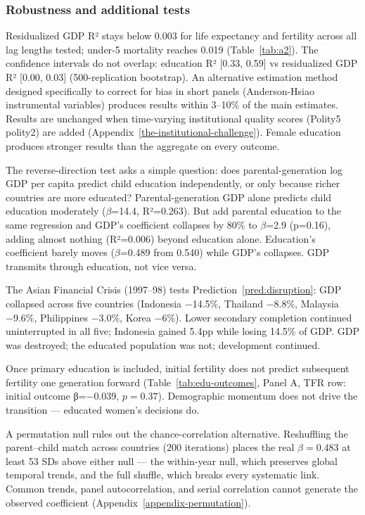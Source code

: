 \documentclass[12pt,letterpaper]{article}
\begin{document}
\subsubsection*{Robustness and additional tests}

Residualized GDP R² stays below 0.003 for life expectancy and fertility
across all lag lengths tested; under-5 mortality reaches 0.019
(Table~\ref{tab:a2}). The confidence intervals do not overlap: education R²
[0.33, 0.59] vs residualized GDP R² [0.00, 0.03] (500-replication
bootstrap). An alternative estimation method designed
specifically to correct for bias in short panels (Anderson-Hsiao
instrumental variables) produces results within 3--10\% of the main
estimates. Results are unchanged when time-varying institutional quality scores (Polity5 polity2) are added (Appendix~\ref{the-institutional-challenge}). Female
education produces stronger results than the aggregate on every outcome.

The reverse-direction test asks a simple question: does parental-generation
log GDP per capita predict child education independently, or only because
richer countries are more educated? Parental-generation GDP alone predicts child education
moderately ($\beta$=14.4, R²=0.263). But add parental education to the
same regression and GDP's coefficient collapses by 80\% to $\beta$=2.9
(p=0.16), adding almost nothing (R²=0.006) beyond education alone.
Education's coefficient barely moves ($\beta$=0.489 from 0.540) while
GDP's collapses. GDP transmits through education, not vice versa.

The Asian Financial Crisis (1997--98) tests Prediction~\ref{pred:disruption}: GDP collapsed across five countries (Indonesia −14.5\%,
Thailand −8.8\%, Malaysia −9.6\%, Philippines −3.0\%, Korea −6\%).
Lower secondary completion continued uninterrupted in all five;
Indonesia gained 5.4pp while losing 14.5\% of GDP. GDP was destroyed; the educated population was not; development continued.

Once primary education is included, initial fertility does not predict
subsequent fertility one generation forward (Table~\ref{tab:edu-outcomes},
Panel A, TFR row: initial outcome β=$-$0.039, $p=0.37$).
Demographic momentum does not drive the transition --- educated women's decisions do.

A permutation null rules out the chance-correlation alternative.
Reshuffling the parent--child match across countries (200 iterations)
places the real $\beta=0.483$ at least 53 SDs above either null --- the
within-year null, which preserves global temporal trends, and the full
shuffle, which breaks every systematic link. Common trends, panel
autocorrelation, and serial correlation cannot generate the observed
coefficient (Appendix~\ref{appendix-permutation}).
\end{document}
